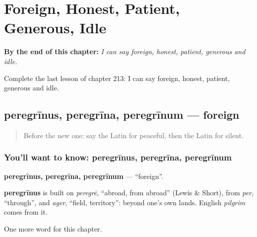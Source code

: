 
\chapter{Foreign, Honest, Patient, Generous, Idle}
\label{ch:la-foreign-honest-patient-generous-idle}

\begin{chapteropening}
\textbf{By the end of this chapter:} \emph{I can say foreign, honest, patient, generous and idle.}

Complete the last lesson of chapter 213: I can say foreign, honest, patient, generous and idle.
\end{chapteropening}

\section[peregrīnus, peregrīna, peregrīnum]{peregrīnus, peregrīna, peregrīnum — foreign}

\label{lesson:LA-C213-peregrinus}



\begin{quote}
Before the new one: say the Latin for peaceful, then the Latin for silent.
\end{quote}

\subsection*{You'll want to know: peregrīnus, peregrīna, peregrīnum}
\textbf{peregrīnus, peregrīna, peregrīnum} — \textquotedblleft{}foreign\textquotedblright{}.

\begin{cousinweb}
\textbf{peregrīnus} is built on \emph{peregrē}, \textquotedblleft{}abroad, from abroad\textquotedblright{} (Lewis \& Short), from \emph{per}, \textquotedblleft{}through\textquotedblright{}, and \emph{ager}, \textquotedblleft{}field, territory\textquotedblright{}: beyond one's own lands. English \emph{pilgrim} comes from it.
\end{cousinweb}

\begin{grammarlens}[title={What you've built}]
One more word for this chapter.
\end{grammarlens}

